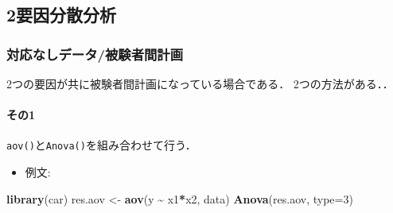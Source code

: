 \documentclass[
  xelatex, ja=standard]{bxjsarticle}
\newenvironment{Shaded}{\begin{snugshade}}{\end{snugshade}}
\newcommand{\AttributeTok}[1]{\textcolor[rgb]{0.13,0.29,0.53}{#1}}
\newcommand{\DecValTok}[1]{\textcolor[rgb]{0.00,0.00,0.81}{#1}}
\newcommand{\FunctionTok}[1]{\textcolor[rgb]{0.13,0.29,0.53}{\textbf{#1}}}
\newcommand{\NormalTok}[1]{#1}
\newcommand{\OtherTok}[1]{\textcolor[rgb]{0.56,0.35,0.01}{#1}}
\newcommand{\SpecialCharTok}[1]{\textcolor[rgb]{0.81,0.36,0.00}{\textbf{#1}}}
\providecommand{\tightlist}{%
  \setlength{\itemsep}{0pt}\setlength{\parskip}{0pt}}
\begin{document}
\subsection{2要因分散分析}\label{ux8981ux56e0ux5206ux6563ux5206ux6790-1}

\subsubsection{対応なしデータ/被験者間計画}\label{ux5bfeux5fdcux306aux3057ux30c7ux30fcux30bfux88abux9a13ux8005ux9593ux8a08ux753b-1}

2つの要因が共に被験者間計画になっている場合である． 2つの方法がある．．

\paragraph{その1}\label{ux305dux306e1-1}

\texttt{aov()}と\texttt{Anova()}を組み合わせて行う．

\begin{itemize}
\tightlist
\item
  例文:
\end{itemize}

\begin{Shaded}
\begin{Highlighting}[]
\FunctionTok{library}\NormalTok{(car)}
\NormalTok{res.aov }\OtherTok{\textless{}{-}} \FunctionTok{aov}\NormalTok{(y }\SpecialCharTok{\textasciitilde{}}\NormalTok{ x1}\SpecialCharTok{*}\NormalTok{x2, data)}
\FunctionTok{Anova}\NormalTok{(res.aov, }\AttributeTok{type=}\DecValTok{3}\NormalTok{) }
\end{Highlighting}
\end{Shaded}
\end{document}
